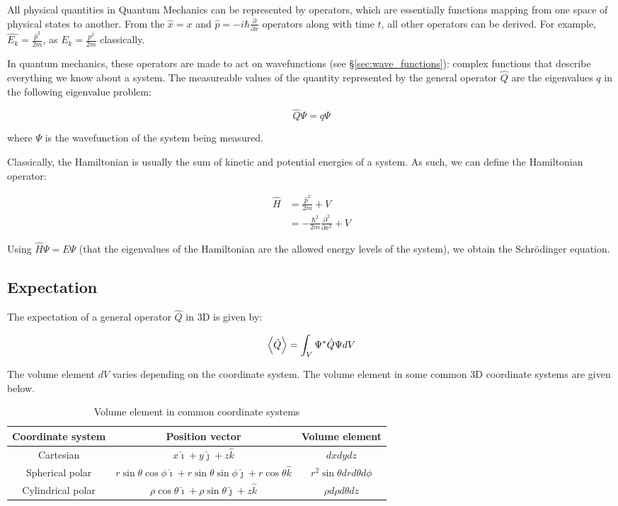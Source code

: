 
All physical quantities in Quantum Mechanics can be represented by operators, which are essentially functions mapping from one space of physical states to another. From the $\hat{x} = x$ and $\hat{p} = -i\hbar\frac{\partial}{\partial x}$ operators along with time $t$, all other operators can be derived. For example, $\hat{E_k} = \frac{\hat{p}^2}{2m}$, as $E_k = \frac{p^2}{2m}$ classically. 

In quantum mechanics, these operators are made to act on wavefunctions (see §\ref{sec:wave_functions}): complex functions that describe everything we know about a system. The measureable values of the quantity represented by the general operator $\hat{Q}$ are the eigenvalues $q$ in the following eigenvalue problem:

\[ \hat{Q}\Psi = q\Psi \]

where $\Psi$ is the wavefunction of the system being measured. 

Classically, the Hamiltonian is usually the sum of kinetic and potential energies of a system. As such, we can define the Hamiltonian operator:

\begin{align*} 
\hat{H} &= \frac{\hat{p}^2}{2m} + V  \\
&= -\frac{\hbar^2}{2m} \frac{\partial^2}{\partial x^2} + V
\end{align*}

Using $\hat{H}{\Psi} = E\Psi$ (that the eigenvalues of the Hamiltonian are the allowed energy levels of the system), we obtain the Schr\"odinger equation. 


\subsection{Expectation}

The expectation of a general operator $\hat{Q}$ in 3D is given by:

\[ \expval{\hat{Q}} = \int_{V} \Psi^*\hat{Q}\Psi dV \]

The volume element $dV$ varies depending on the coordinate system. The volume element in some common 3D coordinate systems are given below. 

\begin{table}[h!]
\centering
	\begin{tabular}{c|c|c}
	Coordinate system & Position vector & Volume element \\ \hline
	Cartesian & $x\hat{\imath} + y\hat{\jmath} + z\hat{k}$ & $dxdydz$ \\
	Spherical polar & $r\sin{\theta}\cos{\phi}\hat{\imath} + r\sin{\theta}\sin{\phi}\hat{\jmath} + r\cos{\theta}\hat{k}$ & $r^2\sin{\theta}drd\theta d\phi$ \\
	Cylindrical polar & $\rho\cos{\theta}\hat{\imath} + \rho\sin{\theta}\hat{\jmath} + z\hat{k}$ & $\rho d\rho d\theta dz$
	\end{tabular}
	\caption{Volume element in common coordinate systems}
\end{table}

